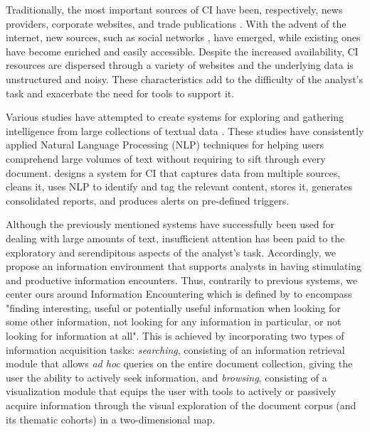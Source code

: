 \documentclass[a4paper]{article}
\begin{document}
Traditionally, the most important sources of CI have been, respectively, news providers, corporate websites, and trade publications \citep{marin2004}. With the advent of the internet, new sources, such as social networks \citet{dey2011}, have emerged, while existing ones have become enriched and easily accessible. Despite the increased availability, CI resources are dispersed through a variety of websites and the underlying data is unstructured and noisy. These characteristics add to the difficulty of the analyst's task and exacerbate the need for tools to support it.

Various studies have attempted to create systems for exploring and gathering intelligence from large collections of textual data \citep{dey2011, esteva2020, lafia2019, lafia2021a}. These studies have consistently applied Natural Language Processing (NLP) techniques for helping users comprehend large volumes of text without requiring to sift through every document. \citet{dey2011} designs a system for CI that captures data from multiple sources, cleans it, uses NLP to identify and tag the relevant content, stores it, generates consolidated reports, and produces alerts on pre-defined triggers.

Although the previously mentioned systems have successfully been used for dealing with large amounts of text, insufficient attention has been paid to the exploratory and serendipitous aspects of the analyst's task. Accordingly, we propose an information environment that supports analysts in having stimulating and productive information encounters. Thus, contrarily to previous systems, we center ours around Information Encountering which is defined by \citet{erdelez2020} to encompass "finding interesting, useful or potentially useful information when looking for some other information, not looking for any information in particular, or not looking for information at all". This is achieved by incorporating two types of information acquisition tasks: \emph{searching}, consisting of an information retrieval module that allows \emph{ad hoc} queries on the entire document collection, giving the user the ability to actively seek information, and \emph{browsing}, consisting of a visualization module that equips the user with tools to actively or passively acquire information through the visual exploration of the document corpus (and its thematic cohorts) in a two-dimensional map. 
\end{document}
